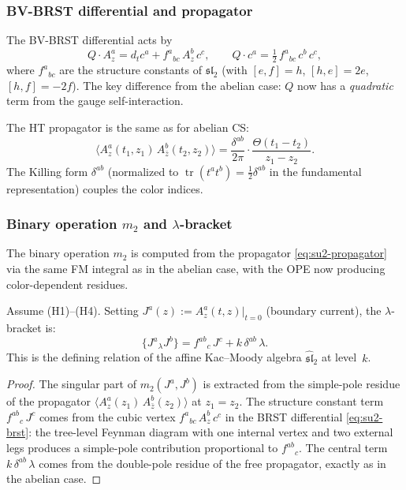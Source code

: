 \subsubsection{BV-BRST differential and propagator}

The BV-BRST differential acts by
\begin{equation}%
Q \cdot A_z^a = d_t c^a + f^a{}_{bc}\, A_z^b\, c^c,
\qquad
Q \cdot c^a = \tfrac{1}{2}\, f^a{}_{bc}\, c^b\, c^c,
\end{equation}
where $f^a{}_{bc}$ are the structure constants of
$\mathfrak{sl}_2$ (with $[e,f] = h$, $[h,e] = 2e$,
$[h,f] = -2f$). The key difference from the abelian case:
$Q$ now has a \emph{quadratic} term from the gauge
self-interaction.

The HT propagator is the same as for abelian CS:
\begin{equation}%
\langle A_z^a(t_1,z_1)\, A_{\bar z}^b(t_2,z_2) \rangle
= \frac{\delta^{ab}}{2\pi} \cdot
 \frac{\Theta(t_1 - t_2)}{z_1 - z_2}.
\end{equation}
The Killing form $\delta^{ab}$ (normalized to
$\operatorname{tr}(t^a t^b) = \frac{1}{2}\delta^{ab}$
in the fundamental representation) couples the color indices.

\subsubsection{Binary operation $m_2$ and $\lambda$-bracket}

The binary operation $m_2$ is computed from the propagator
\eqref{eq:su2-propagator} via the same FM integral as in the
abelian case, with the OPE now producing color-dependent
residues.

\begin{proposition}
Assume \textrm{(H1)--(H4)}. Setting
$J^a(z) := A_z^a(t,z)|_{t=0}$ (boundary current), the
$\lambda$-bracket is:
\begin{equation}%
\{J^a{}_\lambda J^b\}
= f^{ab}{}_c\, J^c + k\, \delta^{ab}\, \lambda.
\end{equation}
This is the defining relation of the affine Kac--Moody algebra
$\widehat{\mathfrak{sl}}_2$ at level~$k$.
\end{proposition}

\begin{proof}
The singular part of $m_2(J^a, J^b)$ is extracted from the
simple-pole residue of the propagator
$\langle A_z^a(z_1)\, A_{\bar z}^b(z_2)\rangle$ at $z_1 = z_2$.
The structure constant term $f^{ab}{}_c\, J^c$ comes from the
cubic vertex $f^a{}_{bc}\, A_z^b\, c^c$ in the BRST differential
\eqref{eq:su2-brst}: the tree-level Feynman diagram with one
internal vertex and two external legs produces a simple-pole
contribution proportional to $f^{ab}{}_c$. The central term
$k\, \delta^{ab}\, \lambda$ comes from the double-pole residue of
the free propagator, exactly as in the abelian case.
\end{proof}

